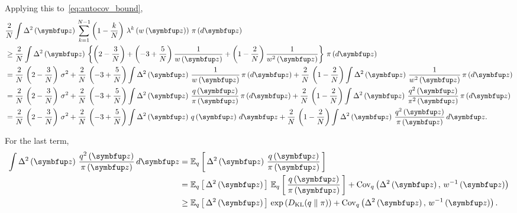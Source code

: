 \begin{proofEnd}
Applying this to~\cref{eq:autocov_bound},
\begin{align*}
  &\frac{2}{N}
  \int
  \Delta^2\left(\vz\right) \,
   \sum_{k=1}^{N-1} 
  \left(1 - \frac{k}{N}\right) \, \lambda^k\left(w\left(\vz\right)\right)
  \, \pi\left(d\vz\right)
  \\
  &\geq
  \frac{2}{N}
  \int
  \Delta^2\left(\vz\right) \,
  \left\{
  \left(2 - \frac{3}{N}\right)
  +
  \left(-3 + \frac{5}{N}\right) \frac{1}{w\left(\vz\right)}
  +
  \left(1 - \frac{2}{N}\right)  \frac{1}{w^2\left(\vz\right)}
  \right\}
  \, \pi\left(d\vz\right)
  \\
  &=
  \frac{2}{N}\,
  \left(2 - \frac{3}{N}\right) \, \sigma^2
  +
  \frac{2}{N}\,
  \left(-3 + \frac{5}{N}\right) 
  \int
  \Delta^2\left(\vz\right) \,
  \frac{1}{w\left(\vz\right)}
  \, \pi\left(d\vz\right)
  +
  \frac{2}{N}\,
  \left(1 - \frac{2}{N}\right)
  \int
  \Delta^2\left(\vz\right) \,
  \frac{1}{w^2\left(\vz\right)}
  \, \pi\left(d\vz\right)
  \\
  &=
  \frac{2}{N}\,
  \left(2 - \frac{3}{N}\right) \, \sigma^2
  +
  \frac{2}{N}\,
  \left(-3 + \frac{5}{N}\right) 
  \int
  \Delta^2\left(\vz\right) \,
  \frac{q\left(\vz\right)}{\pi\left(\vz\right)}
  \, \pi\left(d\vz\right)
  +
  \frac{2}{N}\,
  \left(1 - \frac{2}{N}\right)
  \int
  \Delta^2\left(\vz\right) \,
  \frac{q^2\left(\vz\right)}{\pi^2\left(\vz\right)}
  \, \pi\left(d\vz\right)
  \\
  &=
  \frac{2}{N}\,
  \left(2 - \frac{3}{N}\right) \, \sigma^2
  +
  \frac{2}{N}\,
  \left(-3 + \frac{5}{N}\right) 
  \int
  \Delta^2\left(\vz\right) \,
  q\left(\vz\right)\,d\vz
  +
  \frac{2}{N}\,
  \left(1 - \frac{2}{N}\right)
  \int
  \Delta^2\left(\vz\right) \,
  \frac{q^2\left(\vz\right)}{\pi\left(\vz\right)}\,
  d\vz.
\end{align*}

For the last term,
\begin{align*}
  \int
  \Delta^2\left(\vz\right) \,
  \frac{q^2\left(\vz\right)}{\pi\left(\vz\right)}\,
  d\vz
  &=
  \Esub{q}{
    \Delta^2\left(\vz\right) 
    \, \frac{q\left(\vz\right)}{\pi\left(\vz\right)}
  }
  \\
  &=
  \Esub{q}{
    \Delta^2\left(\vz\right) 
  }
  \,
  \Esub{q}{
    \frac{q\left(\vz\right)}{\pi\left(\vz\right)}
  }
  +
  \text{Cov}_{q}\left(\Delta^2\left(\vz\right),\, w^{-1}\left(\vz\right)\right)
  \\
  &\geq
  \Esub{q}{
    \Delta^2\left(\vz\right) 
  }
  \,
  \exp\left(
    \DKL{q}{\pi}
  \right)
  +
  \text{Cov}_{q}\left(\Delta^2\left(\vz\right),\, w^{-1}\left(\vz\right)\right).
\end{align*}


\end{proofEnd}
